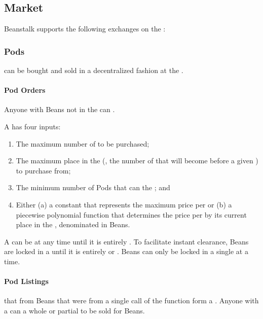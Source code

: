 \documentclass[class=article, crop=false]{standalone}
\begin{document}

\subsection{Market}

Beanstalk supports the following exchanges on the :

\subsubsection{Pods}

 can be bought and sold in a decentralized fashion at the  . 

\paragraph{Pod Orders}

Anyone with Beans not in the  can  . 

A  has four inputs:
\begin{enumerate}
    \item The maximum number of  to be purchased;
    \item The maximum place in the  (, the number of  that will become  before a given ) to purchase from;
    \item The minimum number of Pods that can  the ; and
    \item Either (a) a constant that represents the maximum price per  or (b) a piecewise polynomial function that determines the price per  by its current place in the , denominated in Beans.
\end{enumerate}

A  can be  at any time until it is entirely . To facilitate instant clearance, Beans are locked in a  until it is entirely  or . Beans can only be locked in a single  at a time.

\paragraph{Pod Listings}

 that  from Beans that were  from a single call of the  function form a . Anyone with a  can  a whole or partial  to be sold for Beans.
\end{document}
